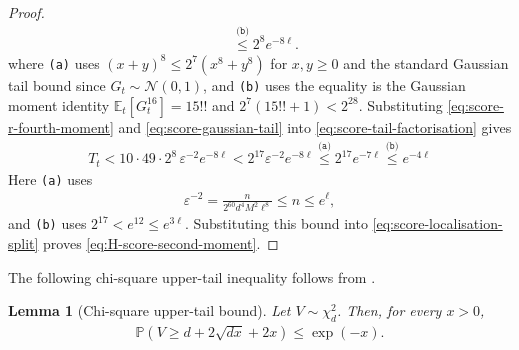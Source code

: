 \documentclass[11pt]{article}
\newtheorem{lemma}[lemma]{Lemma}
\newcommand{\reason}[1]{\texttt{(#1)}}
\newcommand{\explan}[2]{\stackrel{\reason{#2}}{#1}}
\newcommand{\E}{\mathbb E}
\newcommand{\Pp}{\mathbb P}
\newcommand{\N}{\mathcal N}
\newcommand{\1}{\mathbf 1}
\newcommand{\eps}{\varepsilon}
\begin{document}
\begin{proof}
\begin{align}
         & \explan{\leq}{b}
        2^8e^{-8\ell}.
        \label{eq:score-gaussian-tail}
    \end{align}
    where \reason{a} uses $(x+y)^8\leq2^7(x^8+y^8)$ for $x,y\geq0$
    and the standard Gaussian tail bound since $G_t\sim\N(0,1)$,
    and \reason{b} uses the equality is the Gaussian moment identity $\E_t[G_t^{16}]=15!!$
    and $2^7(15!!+1) <2^{28}$.
    Substituting \eqref{eq:score-r-fourth-moment} and
    \eqref{eq:score-gaussian-tail} into
    \eqref{eq:score-tail-factorisation} gives
    \begin{align}
        T_t
        <
        10\cdot49\cdot2^8\,\eps^{-2}e^{-8\ell}
        <
        2^{17}\eps^{-2}e^{-8\ell}
        \explan{\leq}{a}
        2^{17}e^{-7\ell}
        \explan{\leq}{b}
        e^{-4\ell}
        \label{eq:score-tail-before-parameters}
    \end{align}
    Here \reason{a} uses
    \begin{align}
        \eps^{-2}
        =\frac{n}{2^{60}d^4M^2\ell^8}
        \leq n
        \leq e^\ell,
    \end{align}
    and \reason{b} uses $2^{17}<e^{12}\leq e^{3\ell}$.
    Substituting this bound into \eqref{eq:score-localisation-split} proves
    \eqref{eq:H-score-second-moment}.
\end{proof}

The following chi-square upper-tail inequality follows from
\citet[Lemma~1 and Eq.~(4.3)]{laurent2000adaptive}.
\begin{lemma}[Chi-square upper-tail bound]
    \label{lem:chi-square-upper-tail}
    Let $V\sim\chi_d^2$. Then, for every $x>0$,
    \begin{align}
        \Pp\left(
        V\geq d+2\sqrt{dx}+2x
        \right)
        \leq
        \exp(-x).
        \label{eq:chi-square-upper-tail}
    \end{align}
\end{lemma}
\end{document}
